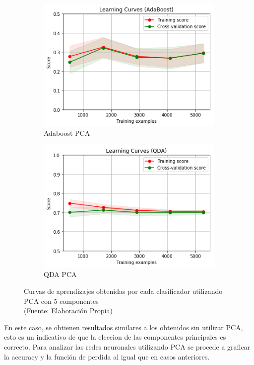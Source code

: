 \begin{figure}[ht!]
\begin{subfigure}{.5\textwidth}
  \centering
  \includegraphics[width=.8\linewidth]{figures/adaboost-PCA.png}
  \caption{Adaboost PCA}
  \label{fig:sub1}
\end{subfigure}%
\begin{subfigure}{.5\textwidth}
  \centering
  \includegraphics[width=.8\linewidth]{figures/qda-PCA.png}
  \caption{QDA PCA}
  \label{fig:sub2}
\end{subfigure}
\caption[abs]{Curvas de aprendizajes obtenidas por cada clasificador utilizando PCA con 5 componentes\\
{\scriptsize (Fuente: Elaboración Propia)}}
\label{fig:comparativa_clasificadores_pca}
\end{figure}

En este caso, se obtienen resultados similares a los obtenidos sin utilizar PCA, esto es un indicativo de que la eleccion de las componentes principales es correcto. Para analizar las redes neuronales utilizando PCA se procede a graficar la accuracy y la función de perdida al igual que en casos anteriores.

